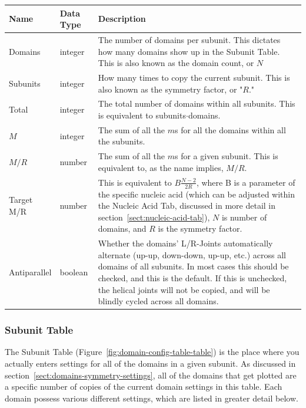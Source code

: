 \documentclass[
titlepage,
fontsize=12pt
]{article}
\begin{document}
	\begin{center}
		\begin{tabular}{|p{1in}|p{.7in}|p{3.5in}|}
			\label{tab:domains-settings-descriptions}
			
			Name & Data Type & Description \\
			\hline
			
			Domains & integer & The number of domains per subunit. This dictates how many domains show up in the Subunit Table. This is also known as the domain count, or $N$ \\ \hline
			
			Subunits & integer & How many times to copy the current subunit. This is also known as the symmetry factor, or "$R$." \\ \hline
			
			Total & integer & The total number of domains within all subunits. This is equivalent to subunits$\cdot$domains. \\ \hline
			
			$M$ & integer & The sum of all the $m$s for all the domains within all the subunits. \\ \hline
			
			$M/R$ & number & The sum of all the $m$s for a given subunit. This is equivalent to, as the name implies, $M/R$. \\ \hline
			
			Target M/R & number & This is equivalent to $B\frac{N-2}{2R}$, where B is a parameter of the specific nucleic acid (which can be adjusted within the Nucleic Acid Tab, discussed in more detail in section~\ref{sect:nucleic-acid-tab}), $N$ is number of domains, and $R$ is the symmetry factor. \\
			
			Antiparallel & boolean & Whether the domains’ L/R-Joints automatically alternate (up-up, down-down, up-up, etc.) across all domains of all subunits. In most cases this should be checked, and this is the default. If this is unchecked, the helical joints will not be copied, and will be blindly cycled across all domains.
		\end{tabular}
	\end{center}
	
	\subsubsection{Subunit Table} \label{sect:domain-subunit-table}
	
	The Subunit Table (Figure~\ref{fig:domain-config-table-table}) is the place where you actually enters settings for all of the domains in a given subunit. As discussed in section~\ref{sect:domains-symmetry-settings}, all of the domains that get plotted are a specific number of copies of the current domain settings in this table. Each domain possess various different settings, which are listed in greater detail below.
	
\end{document}
